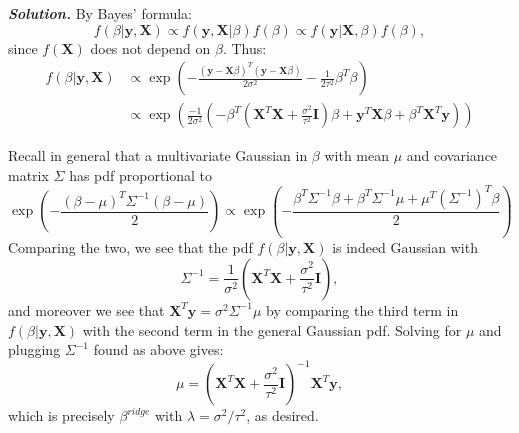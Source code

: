\documentclass[12pt]{article}
\def\bX{\textbf{X}}
\def\by{\textbf{y}}
\def\bI{\textbf{I}}
\newenvironment{solution}[1][\it{Solution}]{\textbf{#1. } }{\vspace{.5cm}}
\begin{document}
\begin{solution}
    By Bayes' formula:
    $$f(\beta | \by, \bX) \propto f(\by, \bX | \beta) f(\beta) \propto f(\by | \bX, \beta) f(\beta),$$
    since $f(\bX)$ does not depend on $\beta$.  Thus:
    $$\begin{aligned}f(\beta | \by, \bX) &\propto \exp\left(-\frac{(\by-\bX\beta)^T(\by-\bX\beta)}{2\sigma^2} - \frac{1}{2\tau^2}\beta^T \beta\right)\\
    &\propto \exp\left(\frac{-1}{2\sigma^2}\left(-\beta^T\left(\bX^T\bX + \frac{\sigma^2}{\tau^2} \bI\right)\beta + \by^T\bX\beta + \beta^T \bX^T \by\right)\right)
    \end{aligned}$$
    
    Recall in general that a multivariate Gaussian in $\beta$ with mean $\mu$ and covariance matrix $\Sigma$ has pdf proportional to
    $$\exp\left(-\frac{(\beta-\mu)^T\Sigma^{-1}(\beta-\mu)}{2}\right) \propto \exp\left(-\frac{\beta^T\Sigma^{-1}\beta +\beta^T\Sigma^{-1}\mu + \mu^T(\Sigma^{-1})^T\beta}{2}\right)$$
    Comparing the two, we see that the pdf $f(\beta | \by, \bX)$ is indeed Gaussian with $$\Sigma^{-1} = \frac{1}{\sigma^2}\left(\bX^T\bX + \frac{\sigma^2}{\tau^2} \bI\right),$$
    and moreover we see that $\bX^T\by = \sigma^2 \Sigma^{-1}\mu$ by comparing the third term in $f(\beta | \by, \bX)$ with the second term in the general Gaussian pdf. Solving for $\mu$ and plugging $\Sigma^{-1}$ found as above gives:
    $$\mu = \left(\bX^T\bX + \frac{\sigma^2}{\tau^2} \bI\right)^{-1}\bX^T\by,$$
    which is precisely $\beta^{ridge}$ with $\lambda = \sigma^2/\tau^2$, as desired.
\end{solution}
\end{document}
